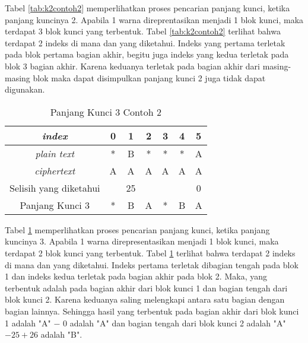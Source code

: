 	Tabel \ref{tab:k2contoh2} memperlihatkan proses pencarian panjang kunci, ketika panjang kuncinya 2. Apabila 1 warna direprentasikan menjadi 1 blok kunci, maka terdapat 3 blok kunci yang terbentuk. Tabel \ref{tab:k2contoh2} terlihat bahwa terdapat 2 indeks di mana \plaintext dan \ciphertext yang diketahui. Indeks yang pertama terletak pada blok pertama bagian akhir, begitu juga indeks yang kedua terletak pada blok 3 bagian akhir. Karena keduanya terletak pada bagian akhir dari masing-masing blok maka dapat disimpulkan panjang kunci 2 juga tidak dapat digunakan.
	\\
	\begin{table}[H]
	 	\centering
	 	\caption{Panjang Kunci 3 Contoh 2}
	 	\setlength{\arrayrulewidth}{.08em}
	 	\begin{tabular}{|c|c|c|c|c|c|c|}\hline
		\textit{index}&0&1&2&3&4&5\\ \hline
	 	\textit{plain text}&\cellcolor{blue!15}*&\cellcolor{blue!15}B&\cellcolor{blue!15}*&\cellcolor{green!15}*&\cellcolor{green!15}*&\cellcolor{green!15}A\\ \hline
	 	\textit{ciphertext}&\cellcolor{blue!15}A&\cellcolor{blue!15}A&\cellcolor{blue!15}A&\cellcolor{green!15}A&\cellcolor{green!15}A&\cellcolor{green!15}A\\ \hline
	 	Selisih yang diketahui& &25& & & &0\\ \hline
	 	Panjang Kunci 3 &*&B&A&*&B&A \\ \hline
	 	\end{tabular}
	 	\label{tab:k3contoh2}
	\end{table}	
	Tabel \ref{tab:k3contoh2} memperlihatkan proses pencarian panjang kunci, ketika panjang kuncinya 3. Apabila 1 warna direpresentasikan menjadi 1 blok kunci, maka terdapat 2 blok kunci yang terbentuk. Tabel \ref{tab:k3contoh2} terlihat bahwa terdapat 2 indeks di mana \plaintext dan \ciphertext yang diketahui. Indeks  pertama terletak dibagian tengah pada blok 1 dan indeks kedua terletak pada bagian akhir pada blok 2. Maka,  \plaintext yang terbentuk adalah pada bagian akhir dari blok kunci 1 dan bagian tengah dari blok kunci 2. Karena keduanya saling melengkapi antara satu bagian dengan bagian lainnya. Sehingga hasil yang terbentuk pada bagian akhir dari blok kunci 1 adalah "A" $-$ $0$ adalah "A" dan bagian tengah dari blok kunci 2 adalah "A" $- 25+26$ adalah "B". 
	\\
